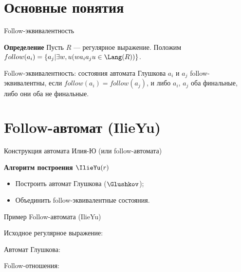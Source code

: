 \section{Основные понятия}
\begin{frame}{Follow-эквивалентность}
  \begin{block}{\bf Определение}
    Пусть $R$ --- регулярное выражение. Положим $follow(a_{i}) = \{a_{j} | \exists w, u(wa_{i}a_{j}u \in\Lang(R))\}$.

    Follow-эквивалентность: состояния автомата Глушкова $a_{i}$ и $a_{j}$ follow-эквивалентны, если $follow(a_{i}) = follow(a_{j})$, и либо $a_{i}$, $a_{j}$ оба финальные, либо они оба не финальные.
  \end{block} %
\end{frame}

\section{Follow-автомат (IlieYu)}
\begin{frame}{Конструкция автомата Илия-Ю (или follow-автомата)}
  \begin{block}{\bf Алгоритм построения $\IlieYu(r)$}
    \begin{itemize}
      \item Построить автомат Глушкова ($\Glushkov$);
      \item Объединить follow-эквивалентные состояния.
    \end{itemize}
  \end{block} %
\end{frame}

\begin{frame}{Пример Follow-автомата (IlieYu)} {\vspace{-5pt}}
  \vspace{-5pt}
   {
    Исходное регулярное выражение:

  }
   {
    Автомат Глушкова:

  }
   {
    Follow-отношения:
  }
\end{frame}

